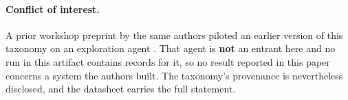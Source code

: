 \paragraph{Conflict of interest.} A prior workshop preprint by the same authors piloted an earlier
version of this taxonomy on an exploration agent \citep{caesar2026}. That agent is \textbf{not} an
entrant here and no run in this artifact contains records for it, so no result reported in this
paper concerns a system the authors built. The taxonomy's provenance is nevertheless disclosed, and
the datasheet carries the full statement.
